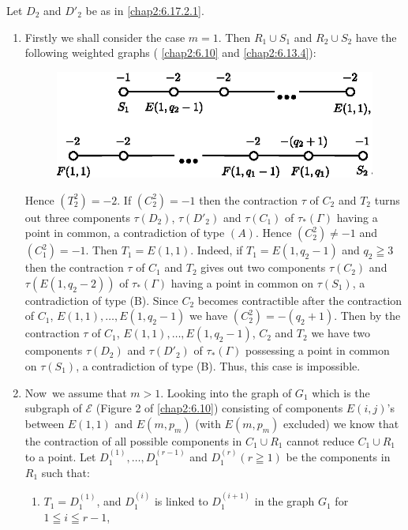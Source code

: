 Let $D_{2}$ and $D'_{2}$ be as in \ref{chap2:6.17.2.1}.
\begin{enumerate}
\renewcommand{\theenumi}{\Roman{enumi}}
\renewcommand{\labelenumi}{(\theenumi)}
\item Firstly we shall consider the case $m=1$. Then $R_{1}\cup S_{1}$
  and $R_{2}\cup S_{2}$ have the following weighted graphs (\cf
  \ref{chap2:6.10} and \ref{chap2:6.13.4}):
\begin{figure}[H]
\centering
\includegraphics[scale=1.2]{figures/chap2-fig37.eps}
\end{figure}

Hence $(T^{2}_{2})=-2$. If $(C^{2}_{2})=-1$ then the contraction
$\tau$ of $C_{2}$ and $T_{2}$ turns out three components
$\tau(D_{2})$, $\tau(D'_{2})$ and $\tau(C_{1})$ of
$\tau_{\ast}(\Gamma)$ having a point in common, a contradiction of
type $(A)$. Hence $(C^{2}_{2})\neq -1$ and $(C^{2}_{1})=-1$. Then
$T_{1}=E(1,1)$. Indeed, if $T_{1}=E(1,q_{2}-1)$ and $q_{2}\geqq 3$
then the contraction $\tau$ of $C_{1}$ and $T_{2}$ gives out two
components $\tau(C_{2})$ and $\tau(E(1,q_{2}-2))$ of
$\tau_{\ast}(\Gamma)$ having a point in common on $\tau(S_{1})$, a
contradiction of type (B). Since $C_{2}$ becomes contractible after
the contraction of $C_{1}$, $E(1,1),\ldots,E(1,q_{2}-1)$ we have
$(C^{2}_{2})=-(q_{2}+1)$. Then by the contraction $\tau$ of $C_{1}$,
$E(1,1),\ldots,E(1,q_{2}-1)$, $C_{2}$ and $T_{2}$ we have two
components $\tau(D_{2})$ and $\tau(D'_{2})$ of $\tau_{\ast}(\Gamma)$
possessing a point in common on $\tau(S_{1})$, a contradiction of type
(B). Thus, this case is impossible. 

\item Now\pageoriginale\ we assume that $m>1$. Looking into the graph
  of $G_{1}$ which is the subgraph of $\mathscr{E}$ (\cf Figure 2 of
  \ref{chap2:6.10}) consisting of components $E(i,j)$'s between $E(1,1)$ and
  $E(m,p_{m})$ (with $E(m,p_{m})$ excluded) we know that the
  contraction of all possible components in $C_{1}\cup R_{1}$ cannot
  reduce $C_{1}\cup R_{1}$ to a point. Let
  $D^{(1)}_{1},\ldots,D^{(r-1)}_{1}$ and $D^{(r)}_{1}(r\geqq 1)$ be
  the components in $R_{1}$ such that:
\begin{enumerate}
\renewcommand{\theenumii}{\arabic{enumii}}
\renewcommand{\labelenumii}{\rm\theenumii$^{\circ}$}
\item $T_{1}=D^{(1)}_{1}$, and $D^{(i)}_{1}$ is linked to
  $D_{1}^{(i+1)}$ in the graph $G_{1}$ for $1\leqq i\leqq r-1$,


\end{enumerate}
\end{enumerate}
